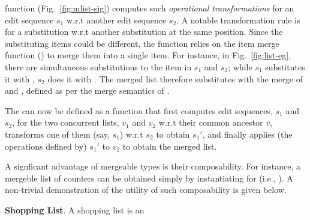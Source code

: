 \begin{itemize}
  function  (Fig.~\ref{fig:mlist-sig}) computes such
  \emph{operational transformations} for an edit sequence $s_1$ w.r.t
  another edit sequence $s_2$. A notable transformation rule is for a
  substitution w.r.t another substitution at the same position. Since
  the substituting items could be different, the function relies on
  the item merge function () to merge them into a single
  item. For instance, in Fig.~\ref{fig:list-eg}, there are
  simultaneous substitutions to the item  in $s_1$ and $s_2$;
  while $s_1$ substitutes it with , $s_2$ does it with . The
  merged list therefore substitutes  with the merge of  and
  , defined as per the merge semantics of .
\end{itemize}
The  can now be defined as a function that first
computes edit sequences, $s_1$ and $s_2$, for the two concurrent
lists, $v_1$ and $v_2$ w.r.t their common ancestor $v$, transforms one
of them (say, $s_1$) w.r.t $s_2$ to obtain $s_1'$, and finally applies
(the operations defined by) $s_1'$ to $v_2$ to obtain the merged list.

A signficant advantage of mergeable types is their composability. For
instance, a mergeble list of counters can be obtained simply by
instantiating  for  (i.e., ). A
non-trivial demonstration of the utility of such composability is
given below.


{\bf Shopping List}. A shopping list is an 

